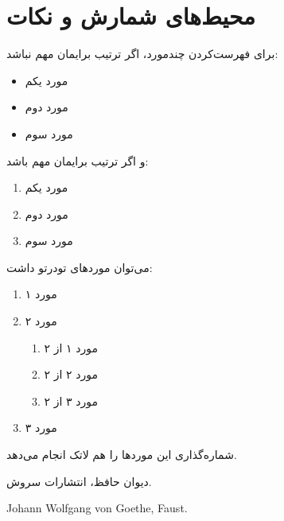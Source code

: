 \documentclass{article}
\begin{document}
\section{محیط‌های شمارش و نکات}
برای فهرست‌کردن چندمورد، اگر ترتیب برایمان مهم نباشد:
\begin{itemize}
\item مورد یکم
\item مورد دوم
\item مورد سوم
\end{itemize}
و اگر ترتیب برایمان مهم باشد:
\begin{enumerate}
\item مورد یکم
\item مورد دوم
\item مورد سوم
\end{enumerate}
می‌توان موردهای تودرتو داشت:
\begin{enumerate}
\item مورد ۱
\item مورد ۲
\begin{enumerate}
\item مورد ۱ از ۲
\item مورد ۲ از ۲
\item مورد ۳ از ۲
\end{enumerate}
\item مورد ۳
\end{enumerate}
شماره‌گذاری این موردها را هم لاتک انجام می‌دهد.


\begin{thebibliography}{9}
دیوان حافظ، انتشارات سروش.
\begin{LTRbibitems}
\resetlatinfont
{} 
Johann Wolfgang von Goethe, Faust.

\end{LTRbibitems}

\end{thebibliography}
\end{document}
